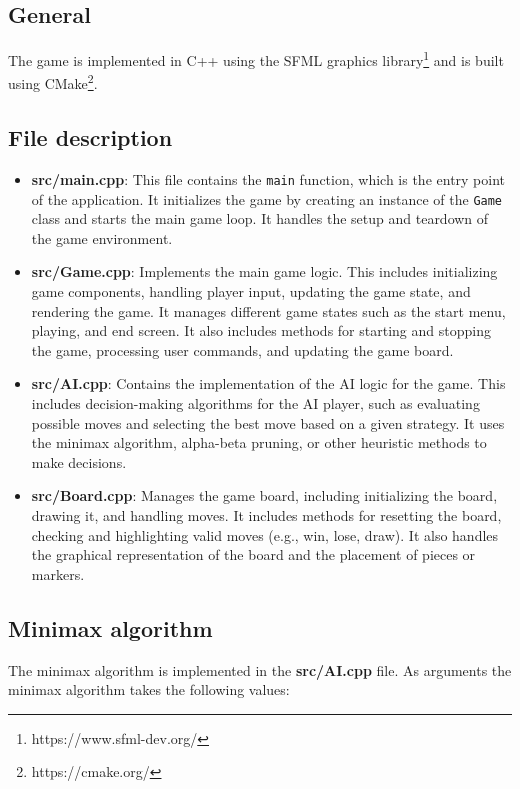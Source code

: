 \documentclass[a4paper,12pt]{article}
\begin{document}
\subsection{General}
The game is implemented in C++ using the SFML graphics library\footnote{https://www.sfml-dev.org/} and is built using CMake\footnote{https://cmake.org/}.
\subsection{File description}
\begin{itemize}
    \item \textbf{src/main.cpp}: This file contains the \texttt{main} function, which is the entry point of the application. It initializes the game by creating an instance of the \texttt{Game} class and starts the main game loop. It handles the setup and teardown of the game environment.

    \item \textbf{src/Game.cpp}: Implements the main game logic. This includes initializing game components, handling player input, updating the game state, and rendering the game. It manages different game states such as the start menu, playing, and end screen. It also includes methods for starting and stopping the game, processing user commands, and updating the game board.

    \item \textbf{src/AI.cpp}: Contains the implementation of the AI logic for the game. This includes decision-making algorithms for the AI player, such as evaluating possible moves and selecting the best move based on a given strategy. It uses the minimax algorithm, alpha-beta pruning, or other heuristic methods to make decisions.

    \item \textbf{src/Board.cpp}: Manages the game board, including initializing the board, drawing it, and handling moves. It includes methods for resetting the board, checking and highlighting valid moves (e.g., win, lose, draw). It also handles the graphical representation of the board and the placement of pieces or markers.
\end{itemize}

\subsection{Minimax algorithm}
The minimax algorithm is implemented in the \textbf{src/AI.cpp} file. 
As arguments the minimax algorithm takes the following values:
\end{document}
